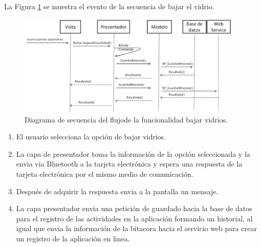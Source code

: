 La Figura \ref{ds5} se muestra el evento de la secuencia de bajar el vidrio.\\
\begin{figure}[H]
\centering
\includegraphics[width=0.95\textwidth]{metodologia/DSbajarvidrios.jpg}
\caption{Diagrama de secuencia del flujode la funcionalidad bajar vidrios.}
\label{ds5}
\end{figure}
%
 \begin{enumerate}
\item El usuario selecciona la opción de bajar vidrios.
\item La capa de presentador toma la información de la opción seleccionada y la envia via Bluetooth a la tarjeta electrónica y espera una respuesta de la tarjeta electrónica por el mismo medio de comunicación.
\item Después de adquirir la respuesta envia a la pantalla un mensaje.
\item La capa presentador envia una petición de guardado hacia la base de datos para el registro de las actividades en la aplicación formando un historial, al igual que envia la información de la bitacora hacia el servicio web para crear un registro de la aplicación en linea.
\end{enumerate}

